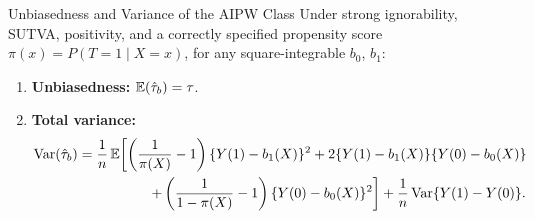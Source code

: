 \documentclass[master.tex]{subfiles}
\begin{document}
\begin{thm}{Unbiasedness and Variance of the AIPW Class}
\label{w10:thm:cond-unbiased}
Under strong ignorability, SUTVA, positivity, and a correctly
specified propensity score $\pi(x) = P(T=1\mid X=x)$, for any
square-integrable $b_0$, $b_1$:
\begin{enumerate}
  \item \textbf{Unbiasedness:} $\mathbb{E}(\hat\tau_b) = \tau$.
  \item \textbf{Total variance:}
    \begin{align}
      \mathrm{Var}(\hat\tau_b)
      &= \frac{1}{n}\,\mathbb{E}\!\left[
           \left(\frac{1}{\pi(X)}-1\right)
           \{Y(1)-b_1(X)\}^2
           + 2\{Y(1)-b_1(X)\}\{Y(0)-b_0(X)\}
         \right. \nonumber \\
      &\hspace{5em}\left.
           + \left(\frac{1}{1-\pi(X)}-1\right)
           \{Y(0)-b_0(X)\}^2
         \right]
      + \frac{1}{n}\,\mathrm{Var}\{Y(1)-Y(0)\}.
      \label{w10:eq:var-b}
    \end{align}
\end{enumerate}
\end{thm}
\end{document}
